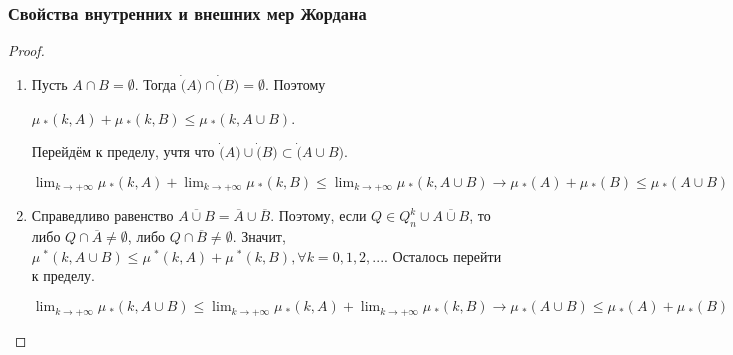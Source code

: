 \documentclass{beamer}
\newcounter{saveenumerate}
\newcommand{\restartenumerate}{\setcounter{enumi}{\value{saveenumerate}}}
\begin{document}
\begin{frame}
\frametitle{Свойства внутренних и внешних мер Жордана}
	\begin{proof}
	\begin{enumerate}[<+->]
	\restartenumerate
	\item Пусть $A \cap B = \emptyset$. Тогда $\dot(A) \cap \dot(B) = \emptyset$. Поэтому 
	\begin{center}
	$\mu\ _*(k, A) + \mu\ _*(k, B) \leq \mu\ _*(k, A \cup B)$.
	\end{center}
	Перейдём к пределу, учтя что $\dot(A) \cup \dot(B) \subset \dot(A \cup B)$.
	\begin{center}
	$\lim_{k \to + \infty }\mu\ _*(k, A) + \lim_{k \to + \infty }\mu\ _*(k, B) \leq \lim_{k \to + \infty }\mu\ _*(k, A \cup B) \rightarrow \mu\ _*(A) + \mu\ _*(B) \leq \mu\ _*(A \cup B)$
	\end{center}
	\item Справедливо равенство $\overline{A \cup B} = \overline{A} \cup \overline{B}$. Поэтому, если $Q \in Q_n^k \cup \overline{A \cup B}$, то либо $Q \cap \overline{A} \neq \emptyset$, либо $Q \cap \overline{B} \neq \emptyset$. Значит, $\mu\ ^*(k, A \cup B) \leq \mu\ ^*(k, A) + \mu\ ^*(k, B), \forall k = 0,1,2,...$.
	Осталось перейти к пределу.
	\begin{center}
	$\lim_{k \to + \infty }\mu\ _*(k, A \cup B) \leq \lim_{k \to + \infty }\mu\ _*(k, A) + \lim_{k \to + \infty }\mu\ _*(k, B) \rightarrow \mu\ _*(A \cup B) \leq \mu\ _*(A) +  \mu\ _*(B)$
	\end{center}
	\end{enumerate}
	\end{proof}
\end{frame}
\end{document}
